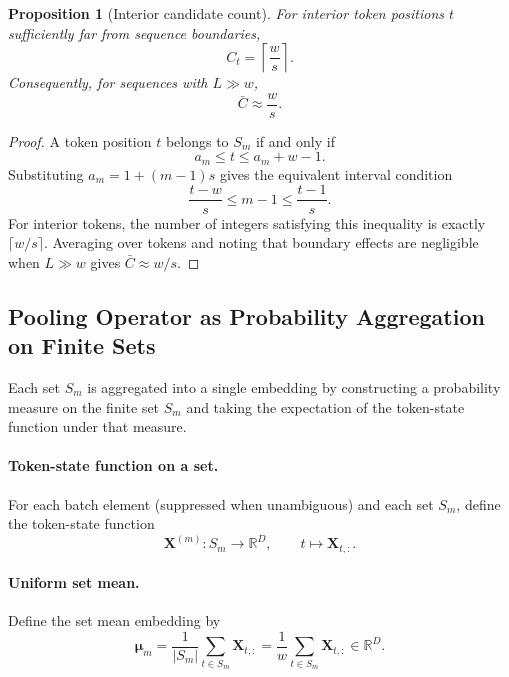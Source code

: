 \documentclass{article}
\theoremstyle{plain}
\newtheorem{proposition}[theorem]{Proposition}
\theoremstyle{definition}
\theoremstyle{remark}
\begin{document}
\begin{proposition}[Interior candidate count]
\label{prop:interior-candidate-count}
For interior token positions $t$ sufficiently far from sequence boundaries,
\begin{equation}
\label{eq:interior-candidate-exact}
C_t=\left\lceil\frac{w}{s}\right\rceil.
\end{equation}
Consequently, for sequences with $L\gg w$,
\begin{equation}
\label{eq:mean-candidate-approx}
\bar C\approx\frac{w}{s}.
\end{equation}
\end{proposition}

\begin{proof}
A token position $t$ belongs to $S_m$ if and only if
\[
a_m\le t\le a_m+w-1.
\]
Substituting $a_m=1+(m-1)s$ gives the equivalent interval condition
\[
\frac{t-w}{s}\le m-1\le \frac{t-1}{s}.
\]
For interior tokens, the number of integers satisfying this inequality is exactly $\lceil w/s\rceil$. Averaging over tokens and noting that boundary effects are negligible when $L\gg w$ gives $\bar C\approx w/s$.
\end{proof}

\subsection{Pooling Operator as Probability Aggregation on Finite Sets}
\label{sec:pooling-operator}

Each set $S_m$ is aggregated into a single embedding by constructing a probability measure on the finite set $S_m$ and taking the expectation of the token-state function under that measure.

\paragraph{Token-state function on a set.}
For each batch element (suppressed when unambiguous) and each set $S_m$, define the token-state function
\begin{equation}
\label{eq:set-token-function}
\mathbf X^{(m)}:S_m\to\mathbb R^D,
\qquad
t\mapsto \mathbf X_{t,:}.
\end{equation}

\paragraph{Uniform set mean.}
Define the set mean embedding by
\begin{equation}
\label{eq:set-mean}
\boldsymbol\mu_m=\frac{1}{|S_m|}\sum_{t\in S_m}\mathbf X_{t,:}
=\frac{1}{w}\sum_{t\in S_m}\mathbf X_{t,:}
\in\mathbb R^D.
\end{equation}
\end{document}

